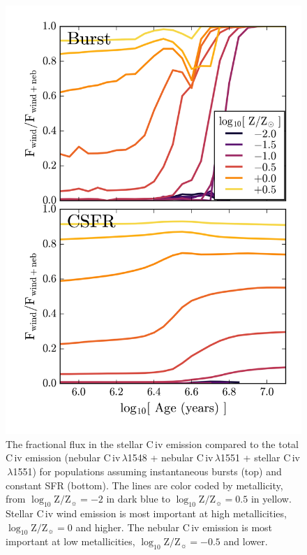 \documentclass[preprint2,trackchanges]{aastex62}
\newcommand{\civ}{C\,{\sc iv}\xspace}
\newcommand{\logten}{\ensuremath{\log_{10}}}
\newcommand{\logZeq}[1]{\ensuremath{\logten \mathrm{Z}/\mathrm{Z}_{\sun} = #1}}
\begin{document}
\begin{figure}
  \begin{center}
    \includegraphics[width=\linewidth]{figs/f16.png}
    \caption{The fractional flux in the stellar \civ emission compared to the total \civ emission (nebular \civ$\,\lambda$1548 + nebular \civ$\,\lambda$1551 + stellar \civ$\,\lambda$1551) for populations assuming instantaneous bursts (top) and constant SFR (bottom). The lines are color coded by metallicity, from \logZeq{-2} in dark blue to \logZeq{0.5} in yellow. Stellar \civ wind emission is most important at high metallicities, \logZeq{0} and higher. The nebular \civ emission is most important at low metallicities, \logZeq{-0.5} and lower.}
    \label{fig:CIVflux}
  \end{center}
\end{figure}
\end{document}
